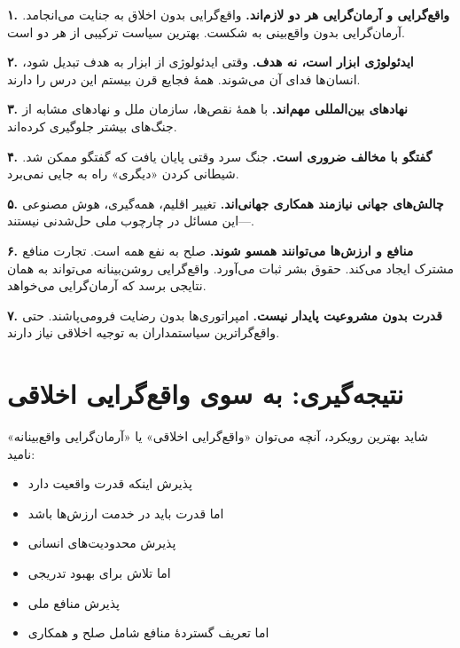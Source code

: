 \begin{tcolorbox}[
    enhanced,
    colback=goldaccent!10,
    colframe=goldaccent,
    boxrule=2pt,
    arc=8pt,
    fonttitle=\bfseries\large,
    title={\rl{🎯 درس‌های کلیدی}}
]

\textbf{۱. واقع‌گرایی و آرمان‌گرایی هر دو لازم‌اند.}
واقع‌گرایی بدون اخلاق به جنایت می‌انجامد. آرمان‌گرایی بدون واقع‌بینی به شکست. بهترین سیاست ترکیبی از هر دو است.

\textbf{۲. ایدئولوژی ابزار است، نه هدف.}
وقتی ایدئولوژی از ابزار به هدف تبدیل شود، انسان‌ها فدای آن می‌شوند. همهٔ فجایع قرن بیستم این درس را دارند.

\textbf{۳. نهادهای بین‌المللی مهم‌اند.}
با همهٔ نقص‌ها، سازمان ملل و نهادهای مشابه از جنگ‌های بیشتر جلوگیری کرده‌اند.

\textbf{۴. گفتگو با مخالف ضروری است.}
جنگ سرد وقتی پایان یافت که گفتگو ممکن شد. شیطانی کردن «دیگری» راه به جایی نمی‌برد.

\textbf{۵. چالش‌های جهانی نیازمند همکاری جهانی‌اند.}
تغییر اقلیم، همه‌گیری، هوش مصنوعی—این مسائل در چارچوب ملی حل‌شدنی نیستند.

\textbf{۶. منافع و ارزش‌ها می‌توانند همسو شوند.}
صلح به نفع همه است. تجارت منافع مشترک ایجاد می‌کند. حقوق بشر ثبات می‌آورد. واقع‌گرایی روشن‌بینانه می‌تواند به همان نتایجی برسد که آرمان‌گرایی می‌خواهد.

\textbf{۷. قدرت بدون مشروعیت پایدار نیست.}
امپراتوری‌ها بدون رضایت فرومی‌پاشند. حتی واقع‌گراترین سیاستمداران به توجیه اخلاقی نیاز دارند.

\end{tcolorbox}

\section{نتیجه‌گیری: به سوی واقع‌گرایی اخلاقی}


شاید بهترین رویکرد، آنچه می‌توان «واقع‌گرایی اخلاقی» یا «آرمان‌گرایی واقع‌بینانه» نامید:

\begin{itemize}
    \item پذیرش اینکه قدرت واقعیت دارد
    \item اما قدرت باید در خدمت ارزش‌ها باشد
    \item پذیرش محدودیت‌های انسانی
    \item اما تلاش برای بهبود تدریجی
    \item پذیرش منافع ملی
    \item اما تعریف گستردهٔ منافع شامل صلح و همکاری
\end{itemize}

